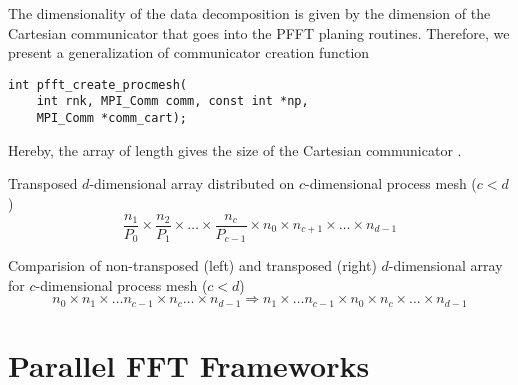 The dimensionality of the data decomposition is given by the dimension of the Cartesian communicator that
goes into the PFFT planing routines. Therefore, we present a generalization of communicator creation function
\begin{lstlisting}
int pfft_create_procmesh(
    int rnk, MPI_Comm comm, const int *np,
    MPI_Comm *comm_cart);
\end{lstlisting}
Hereby, the array  of length  gives the size of the Cartesian communicator .


\newpage
Transposed $d$-dimensional array distributed on $c$-dimensional process mesh ($c<d$)
\begin{equation*}
  \frac{n_1}{P_0} \times \frac{n_2}{P_1} \times \hdots \times \frac{n_c}{P_{c-1}}  \times n_0 \times n_{c+1} \times \hdots \times n_{d-1}
\end{equation*}

Comparision of non-transposed (left) and transposed (right) $d$-dimensional array for $c$-dimensional process mesh ($c<d$)
\begin{equation*}
  n_0\times n_1\times \hdots n_{c-1} \times n_c \hdots \times n_{d-1} \Rightarrow n_1 \times \hdots n_{c-1} \times n_0 \times n_c \times \hdots \times n_{d-1}
\end{equation*}












\section{Parallel FFT Frameworks}


